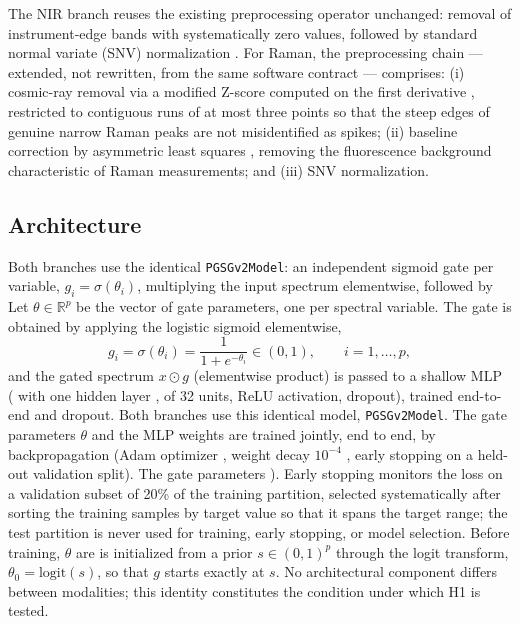 \documentclass[preprint,12pt]{elsarticle}
\providecommand{\DIFaddtex}[1]{{\protect\color{blue} \sf #1}} %
\providecommand{\DIFdeltex}[1]{{\protect\color{red} \scriptsize #1}} %
\providecommand{\DIFaddbegin}{} %
\providecommand{\DIFaddend}{} %
\providecommand{\DIFdelbegin}{} %
\providecommand{\DIFdelend}{} %
\providecommand{\DIFadd}[1]{\texorpdfstring{\DIFaddtex{#1}}{#1}} %
\providecommand{\DIFdel}[1]{\texorpdfstring{\DIFdeltex{#1}}{}} %
\providecommand{\DIFscaledelfig}{0.5}
\newlength{\DIFdelgraphicswidth} %
\newlength{\DIFdelgraphicsheight} %
\providecommand{\DIFaddincludegraphics}[2][]{{\color{blue}\fbox{\DIFOincludegraphics[#1]{#2}}}} %
\providecommand{\DIFdelincludegraphics}[2][]{%
\sbox{\DIFdelgraphicsbox}{\DIFOincludegraphics[#1]{#2}}%
\settoboxwidth{\DIFdelgraphicswidth}{\DIFdelgraphicsbox} %
\settoboxtotalheight{\DIFdelgraphicsheight}{\DIFdelgraphicsbox} %
\scalebox{\DIFscaledelfig}{%
\parbox[b]{\DIFdelgraphicswidth}{\usebox{\DIFdelgraphicsbox}\\[-\baselineskip] \rule{\DIFdelgraphicswidth}{0em}}\llap{\resizebox{\DIFdelgraphicswidth}{\DIFdelgraphicsheight}{%
\setlength{\unitlength}{\DIFdelgraphicswidth}%
\begin{picture}(1,1)%
\thicklines\linethickness{2pt} %
{\color[rgb]{1,0,0}\put(0,0){\framebox(1,1){}}}%
{\color[rgb]{1,0,0}\put(0,0){\line( 1,1){1}}}%
{\color[rgb]{1,0,0}\put(0,1){\line(1,-1){1}}}%
\end{picture}%
}\hspace*{3pt}}} %
} %
\DeclareRobustCommand{\DIFaddbegin}{\DIFOaddbegin \let\includegraphics\DIFaddincludegraphics} %
\DeclareRobustCommand{\DIFaddend}{\DIFOaddend \let\includegraphics\DIFOincludegraphics} %
\DeclareRobustCommand{\DIFdelbegin}{\DIFOdelbegin \let\includegraphics\DIFdelincludegraphics} %
\DeclareRobustCommand{\DIFdelend}{\DIFOaddend \let\includegraphics\DIFOincludegraphics} %
\begin{document}
The NIR branch reuses the existing preprocessing operator unchanged: removal of instrument-edge bands with systematically zero values, followed by standard normal variate (SNV) normalization \cite{barnes1989snv}. For Raman, the preprocessing chain --- extended, not rewritten, from the same software contract --- comprises: (i) cosmic-ray removal via a modified Z-score computed on the first derivative \cite{whitaker2018}, restricted to contiguous runs of at most three points so that the steep edges of genuine narrow Raman peaks are not misidentified as spikes; (ii) baseline correction by asymmetric least squares \cite{eilers2005}, removing the fluorescence background characteristic of Raman measurements; and (iii) SNV normalization.

\subsection{Architecture}
\DIFaddbegin \label{sec:architecture}
\DIFaddend 

\DIFdelbegin \DIFdel{Both branches use the identical \texttt{PGSGv2Model}: an independent sigmoid gate per variable, $g_i=\sigma(\theta_i)$, multiplying the input spectrum elementwise, followed by }\DIFdelend \DIFaddbegin \DIFadd{Let $\theta\in\mathbb{R}^{p}$ be the vector of gate parameters, one per spectral variable. The gate is obtained by applying the logistic sigmoid elementwise,
}\begin{equation}
g_i=\sigma(\theta_i)=\frac{1}{1+e^{-\theta_i}}\in(0,1), \qquad i=1,\dots,p,
\label{eq:gate}
\end{equation}
\DIFadd{and the gated spectrum $x\odot g$ (elementwise product) is passed to }\DIFaddend a shallow MLP \DIFdelbegin \DIFdel{(}\DIFdelend \DIFaddbegin \DIFadd{with }\DIFaddend one hidden layer \DIFdelbegin \DIFdel{, }\DIFdelend \DIFaddbegin \DIFadd{of }\DIFaddend 32 units, ReLU activation, \DIFdelbegin \DIFdel{dropout), trained end-to-end }\DIFdelend \DIFaddbegin \DIFadd{and dropout. Both branches use this identical model, \texttt{PGSGv2Model}. The gate parameters $\theta$ and the MLP weights are trained jointly, end to end, }\DIFaddend by backpropagation (Adam optimizer \cite{kingma2015adam}, weight decay $10^{-4}$\DIFdelbegin \DIFdel{, early stopping on a held-out validation split). The gate parameters }\DIFdelend \DIFaddbegin \DIFadd{). Early stopping monitors the loss on a validation subset of 20\% of the training partition, selected systematically after sorting the training samples by target value so that it spans the target range; the test partition is never used for training, early stopping, or model selection. Before training, }\DIFaddend $\theta$ \DIFdelbegin \DIFdel{are }\DIFdelend \DIFaddbegin \DIFadd{is }\DIFaddend initialized from a prior $s\in(0,1)^{p}$ through the logit transform, $\theta_0=\mathrm{logit}(s)$, so that $g$ starts exactly at $s$. No architectural component differs between modalities; this identity constitutes the condition under which H1 is tested.
\end{document}
